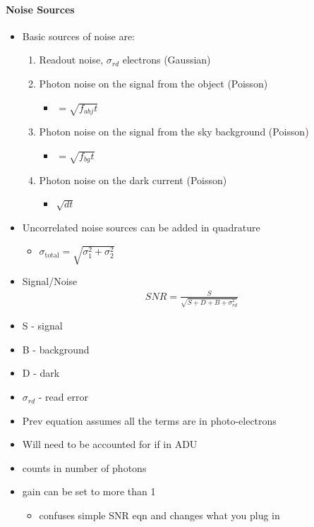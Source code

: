 \documentclass[a4paper,11pt,normalem]{article}
\begin{document}
\paragraph{Noise Sources}
\begin{itemize}
    \item Basic sources of noise are:
        \begin{enumerate}
            \item Readout noise, \(\sigma_{rd}\) electrons (Gaussian)
            \item Photon noise on the signal from the object (Poisson)
                \begin{itemize}
                    \item \(= \sqrt{f_{abj}t}\)
                \end{itemize}
            \item Photon noise on the signal from the sky background (Poisson)
                \begin{itemize}
                    \item \(= \sqrt{f_{bg}t}\)
                \end{itemize}
            \item Photon noise on the dark current (Poisson)
                \begin{itemize}
                    \item \(\sqrt{dt}\)
                \end{itemize}
        \end{enumerate}
    \item Uncorrelated noise sources can be added in quadrature
        \begin{itemize}
            \item \(\sigma_{\text{total}} = \sqrt{\sigma_{1}^{2} + \sigma_{2}^{2}}\)
        \end{itemize}
    \item Signal/Noise
        \begin{align*}
            SNR = \frac{S}{\sqrt{S + D + B + \sigma_{rd}^2}}
        \end{align*}
    \item S - signal
    \item B - background
    \item D - dark
    \item \(\sigma_{rd}\) - read error
    \item Prev equation assumes all the terms are in photo-electrons
    \item Will need to be accounted for if in ADU
    \item counts in number of photons
    \item gain can be set to more than 1
        \begin{itemize}
            \item confuses simple SNR eqn and changes what you plug in
        \end{itemize}
\end{itemize}
\end{document}
